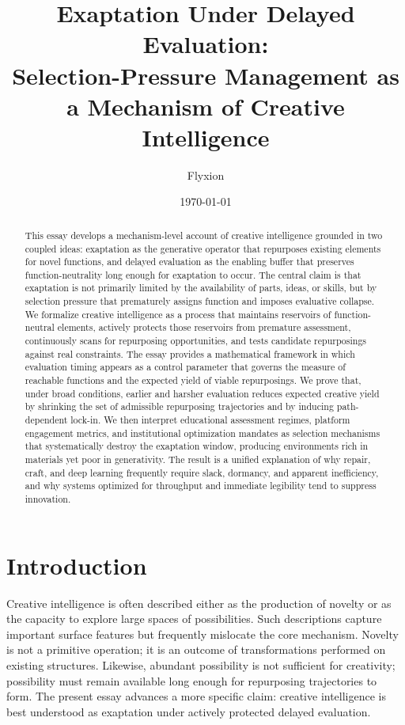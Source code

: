 \documentclass[11pt]{article}
\title{\textbf{Exaptation Under Delayed Evaluation:}\\
\large Selection-Pressure Management as a Mechanism of Creative Intelligence}
\author{Flyxion}
\date{\today}
\theoremstyle{definition}
\begin{document}
\maketitle

\begin{abstract}
This essay develops a mechanism-level account of creative intelligence grounded in two coupled ideas: exaptation as the generative operator that repurposes existing elements for novel functions, and delayed evaluation as the enabling buffer that preserves function-neutrality long enough for exaptation to occur. The central claim is that exaptation is not primarily limited by the availability of parts, ideas, or skills, but by selection pressure that prematurely assigns function and imposes evaluative collapse. We formalize creative intelligence as a process that maintains reservoirs of function-neutral elements, actively protects those reservoirs from premature assessment, continuously scans for repurposing opportunities, and tests candidate repurposings against real constraints. The essay provides a mathematical framework in which evaluation timing appears as a control parameter that governs the measure of reachable functions and the expected yield of viable repurposings. We prove that, under broad conditions, earlier and harsher evaluation reduces expected creative yield by shrinking the set of admissible repurposing trajectories and by inducing path-dependent lock-in. We then interpret educational assessment regimes, platform engagement metrics, and institutional optimization mandates as selection mechanisms that systematically destroy the exaptation window, producing environments rich in materials yet poor in generativity. The result is a unified explanation of why repair, craft, and deep learning frequently require slack, dormancy, and apparent inefficiency, and why systems optimized for throughput and immediate legibility tend to suppress innovation.
\end{abstract}

\newpage
\section{Introduction}

Creative intelligence is often described either as the production of novelty or as the capacity to explore large spaces of possibilities. Such descriptions capture important surface features but frequently mislocate the core mechanism. Novelty is not a primitive operation; it is an outcome of transformations performed on existing structures. Likewise, abundant possibility is not sufficient for creativity; possibility must remain available long enough for repurposing trajectories to form. The present essay advances a more specific claim: creative intelligence is best understood as exaptation under actively protected delayed evaluation.
\end{document}
